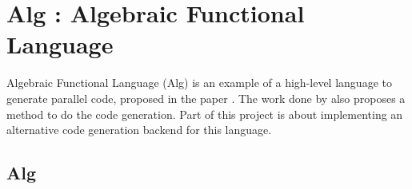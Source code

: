 \chapter{Alg : Algebraic Functional Language} \label{chap:alg}
Algebraic Functional Language (Alg) is an example of a high-level language to generate parallel code, proposed in the paper \cite{castroAlgebraicMultipartyProtocol}. The work done by \cite{castroAlgebraicMultipartyProtocol} also proposes a method to do the code generation. Part of this project is about implementing an alternative code generation backend for this language. %
\section{Alg}

